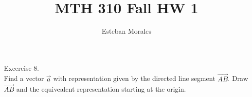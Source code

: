 \documentclass[12pt]{article}
\newenvironment{statement}[2][Section]{\begin{trivlist}
\item[\hskip \labelsep {\bfseries #1}\hskip \labelsep {\bfseries #2.}]}{\end{trivlist}}
\begin{document}
 
%
%
 
\title{MTH 310 Fall HW 1} %
\author{Esteban Morales} %
\maketitle


\begin{statement}{10.2} %
	Excercise 8.\\ Find a vector $\vec{a}$ with representation given by the directed line segment $\vec{AB}$. Draw $\vec{AB}$ and the 
	equivealent representation starting at the origin.
\end{statement}
 
\end{document}
